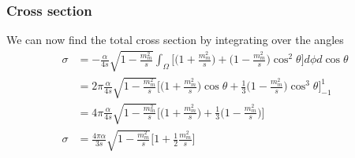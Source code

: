 \documentclass[11pt]{article}
\begin{document}
\subsubsection{Cross section}
\begin{flushleft}
We can now find the total cross section by integrating over the angles
\begin{align*}
\sigma &= - \frac{\alpha}{4 s} \sqrt{1 - \frac{m_m^2}{s}} \int_{\Omega}   \Big[ \Big( 1 + \frac{m_m^2}{s}\Big) + \Big( 1 - \frac{m_m^2}{s}\Big) \cos^2 \theta \Big] d \phi d \cos \theta\\
&= 2 \pi \frac{\alpha}{4 s} \sqrt{1 - \frac{m_m^2}{s}}  \Big[ \Big( 1 + \frac{m_m^2}{s}\Big)\cos \theta + \frac{1}{3} \Big( 1 - \frac{m_m^2}{s}\Big) \cos^3 \theta \Big]_{-1}^{1}\\
&= 4 \pi \frac{\alpha}{4 s} \sqrt{1 - \frac{m_m^2}{s}}  \Big[ \Big( 1 + \frac{m_m^2}{s}\Big) + \frac{1}{3} \Big( 1 - \frac{m_m^2}{s}\Big) \Big]\\
\sigma &=\frac{4 \pi \alpha}{3 s}\sqrt{1 - \frac{m_m^2}{s}}  \Big[1 + \frac{1}{2}\frac{m_m^2}{s}\Big]\\
\end{align*}
\end{flushleft}

\pagebreak
\end{document}
